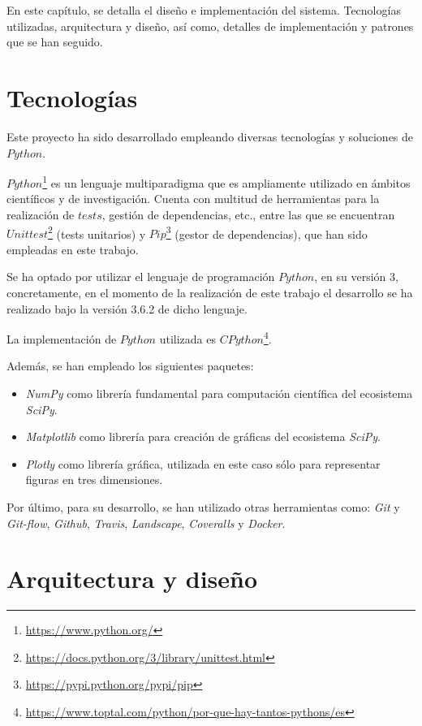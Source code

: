 En este capítulo, se detalla el diseño e implementación del sistema. Tecnologías utilizadas, arquitectura
y diseño, así como, detalles de implementación y patrones que se han seguido.

\section{Tecnologías}

Este proyecto ha sido desarrollado empleando diversas tecnologías y soluciones de $Python$.

$Python$\footnote{\url{https://www.python.org/}} es un lenguaje multiparadigma que es ampliamente utilizado en ámbitos científicos y de investigación.
Cuenta con multitud de herramientas para la realización de $tests$, gestión de dependencias, etc., entre las
que se encuentran $Unittest$\footnote{\url{https://docs.python.org/3/library/unittest.html}} (tests unitarios) y $Pip$\footnote{\url{https://pypi.python.org/pypi/pip}} (gestor de dependencias), que han sido empleadas en este trabajo.

Se ha optado por utilizar el lenguaje de programación $Python$, en su versión 3, concretamente, en el momento de la realización de este trabajo el desarrollo se ha realizado
bajo la versión 3.6.2 de dicho lenguaje.

La implementación de $Python$ utilizada es $CPython$\footnote{\url{https://www.toptal.com/python/por-que-hay-tantos-pythons/es}}.

Además, se han empleado los siguientes paquetes:

\begin{itemize}
  \item \textit{NumPy} como librería fundamental para computación científica del ecosistema \textit{SciPy}.
  \item \textit{Matplotlib} como librería para creación de gráficas del ecosistema \textit{SciPy}.
  \item \textit{Plotly} como librería gráfica, utilizada en este caso sólo para representar figuras en tres dimensiones.
\end{itemize}

Por último, para su desarrollo, se han utilizado otras herramientas como: \textit{Git} y \textit{Git-flow}, \textit{Github},
\textit{Travis}, \textit{Landscape}, \textit{Coveralls} y \textit{Docker}.

\section{Arquitectura y diseño}

